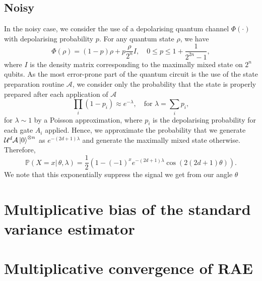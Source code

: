 \subsection{Noisy} \label{app:noise}
In the noisy case, we consider the use of a depolarising quantum channel $\Phi\left( \cdot \right) $ with depolarising probability $p$. For any quantum state $\rho$, we have
\[
\Phi\left( \rho \right) = \left( 1- p \right) \rho + p\frac{\rho}{2^{n}}I, \quad 0 \le p \le 1 + \frac{1}{2^{2n} - 1}
,\]
where $I$ is the density matrix corresponding to the maximally mixed state on $2^{n}$ qubits. As the most error-prone part of the quantum circuit is the use of the state preparation routine $\mathcal{A}$, we consider only the probability that the state is properly prepared after each application of $\mathcal{A}$
\[
\prod_i \left( 1 - p_i \right) \approx e^{- \lambda}, \quad \text{for } \lambda = \sum_i p_i,
\]
for $\lambda \sim 1$ by a Poisson approximation, where  $p_i$ is the depolarising probability for each gate $A_i$ applied. Hence, we approximate the probability that we generate $\mathcal{U}^{d} \mathcal{A} \ket{0}^{\otimes n}$ as $e^{-\left( 2d+1 \right) \lambda}$ and generate the maximally mixed state otherwise. Therefore,
\[
	\mathbb{P}\left( X = x| \, \theta, \lambda \right) = \frac{1}{2}\left( 1 - \left( -1 \right) ^{x} e^{ - \left( 2d+1 \right) \lambda} \cos\left( 2\left( 2d+1 \right) \theta \right)   \right)
.\]
We note that this exponentially suppress the signal we get from our angle $\theta$

\section{Multiplicative bias of the standard variance estimator} \label{app::logvar}

\section{Multiplicative convergence of RAE} \label{app::decrease}
